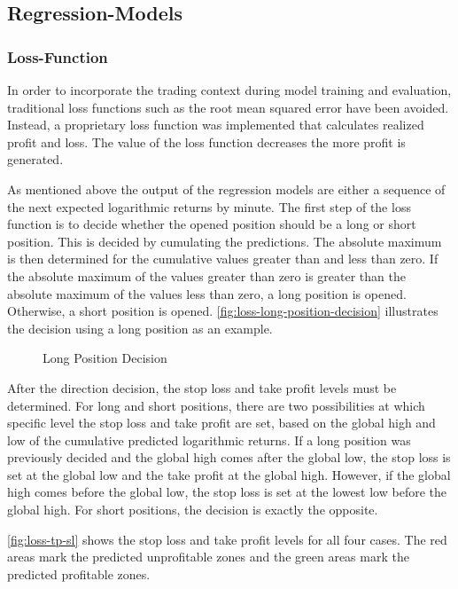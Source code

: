 \subsection{Regression-Models}

\subsubsection{Loss-Function}

In order to incorporate the trading context during model training and evaluation, traditional loss functions such as the root mean squared error have been avoided. Instead, a proprietary loss function was implemented that calculates realized profit and loss. The value of the loss function decreases the more profit is generated.

As mentioned above the output of the regression models are either a sequence of the next expected logarithmic returns by minute. The first step of the loss function is to decide whether the opened position should be a long or short position. This is decided by cumulating the predictions. The absolute maximum is then determined for the cumulative values greater than and less than zero. If the absolute maximum of the values greater than zero is greater than the absolute maximum of the values less than zero, a long position is opened. Otherwise, a short position is opened. \autoref{fig:loss-long-position-decision} illustrates the decision using a long position as an example.

\begin{figure}[H]
    \centering
    
    \caption{Long Position Decision}
    \label{fig:loss-long-position-decision}
\end{figure}

After the direction decision, the stop loss and take profit levels must be determined. For long and short positions, there are two possibilities at which specific level the stop loss and take profit are set, based on the global high and low of the cumulative predicted logarithmic returns. If a long position was previously decided and the global high comes after the global low, the stop loss is set at the global low and the take profit at the global high. However, if the global high comes before the global low, the stop loss is set at the lowest low before the global high. For short positions, the decision is exactly the opposite.

\autoref{fig:loss-tp-sl} shows the stop loss and take profit levels for all four cases. The red areas mark the predicted unprofitable zones and the green areas mark the predicted profitable zones.

